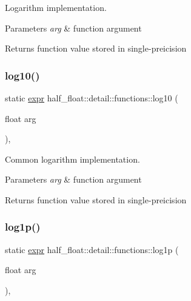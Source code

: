 Logarithm implementation. 
\begin{DoxyParams}{Parameters}
{\em arg} & function argument \\
\hline
\end{DoxyParams}
\begin{DoxyReturn}{Returns}
function value stored in single-\/preicision 
\end{DoxyReturn}
\mbox{\label{structhalf__float_1_1detail_1_1functions_a7cf0027f88e319725aaa3da81c21ac1d}} 
\subsubsection{\texorpdfstring{log10()}{log10()}}
{\footnotesize\ttfamily static \hyperlink{structhalf__float_1_1detail_1_1expr}{expr} half\+\_\+float\+::detail\+::functions\+::log10 (\begin{DoxyParamCaption}\item[{float}]{arg }\end{DoxyParamCaption})\hspace{0.3cm}{\ttfamily [inline]}, {\ttfamily [static]}}

Common logarithm implementation. 
\begin{DoxyParams}{Parameters}
{\em arg} & function argument \\
\hline
\end{DoxyParams}
\begin{DoxyReturn}{Returns}
function value stored in single-\/preicision 
\end{DoxyReturn}
\mbox{\label{structhalf__float_1_1detail_1_1functions_a27ae5cf1c13b9d98f943e9cd968db554}} 
\subsubsection{\texorpdfstring{log1p()}{log1p()}}
{\footnotesize\ttfamily static \hyperlink{structhalf__float_1_1detail_1_1expr}{expr} half\+\_\+float\+::detail\+::functions\+::log1p (\begin{DoxyParamCaption}\item[{float}]{arg }\end{DoxyParamCaption})\hspace{0.3cm}{\ttfamily [inline]}, {\ttfamily [static]}}

